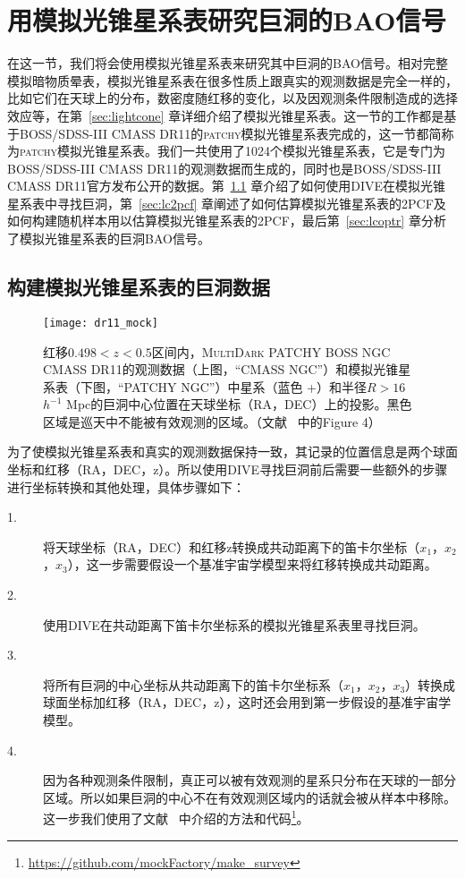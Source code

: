 {\section{用模拟光锥星系表研究巨洞的BAO信号}

在这一节，我们将会使用模拟光锥星系表来研究其中巨洞的BAO信号。相对完整模拟暗物质晕表，模拟光锥星系表在很多性质上跟真实的观测数据是完全一样的，比如它们在天球上的分布，数密度随红移的变化，以及因观测条件限制造成的选择效应等，在第~\ref{sec:lightcone} 章详细介绍了模拟光锥星系表。这一节的工作都是基于BOSS/SDSS-III CMASS DR11的\textsc{patchy}模拟光锥星系表完成的，这一节都简称为\textsc{patchy}模拟光锥星系表。我们一共使用了1024个模拟光锥星系表，它是专门为BOSS/SDSS-III CMASS DR11的观测数据而生成的，同时也是BOSS/SDSS-III CMASS DR11官方发布公开的数据。第~\ref{sec:lcdata} 章介绍了如何使用DIVE在模拟光锥星系表中寻找巨洞，第~\ref{sec:lc2pcf} 章阐述了如何估算模拟光锥星系表的2PCF及如何构建随机样本用以估算模拟光锥星系表的2PCF，最后第~\ref{sec:lcoptr} 章分析了模拟光锥星系表的巨洞BAO信号。

\subsection{构建模拟光锥星系表的巨洞数据}
\label{sec:lcdata}

\begin{figure}
\centering
\texttt{[image: dr11\_mock]}
\caption{红移$0.498 < z < 0.5$区间内，\textsc{MultiDark PATCHY} BOSS NGC CMASS DR11的观测数据（上图，“CMASS NGC”）和模拟光锥星系表（下图，“\textsc{PATCHY} NGC”）中星系（蓝色{\color{blue} +}）和半径$R > 16$ $h^{-1}$ Mpc的巨洞中心位置在天球坐标（RA，DEC）上的投影。黑色区域是巡天中不能被有效观测的区域。（文献 ~中的Figure 4）}
\label{fig:cmass_sky_ngc}
\end{figure}

为了使模拟光锥星系表和真实的观测数据保持一致，其记录的位置信息是两个球面坐标和红移（RA，DEC，z）。所以使用DIVE寻找巨洞前后需要一些额外的步骤进行坐标转换和其他处理，具体步骤如下：
\begin{description}
\item[1.] 将天球坐标（RA，DEC）和红移z转换成共动距离下的笛卡尔坐标（$x_1$，$x_2$，$x_3$），这一步需要假设一个基准宇宙学模型来将红移转换成共动距离。
\item[2.] 使用DIVE在共动距离下笛卡尔坐标系的模拟光锥星系表里寻找巨洞。
\item[3.] 将所有巨洞的中心坐标从共动距离下的笛卡尔坐标系（$x_1$，$x_2$，$x_3$）转换成球面坐标加红移（RA，DEC，z），这时还会用到第一步假设的基准宇宙学模型。
\item[4.] 因为各种观测条件限制，真正可以被有效观测的星系只分布在天球的一部分区域。所以如果巨洞的中心不在有效观测区域内的话就会被从样本中移除。这一步我们使用了文献 ~中介绍的方法和代码\footnote{\url{https://github.com/mockFactory/make_survey}}。
\end{description}

}
